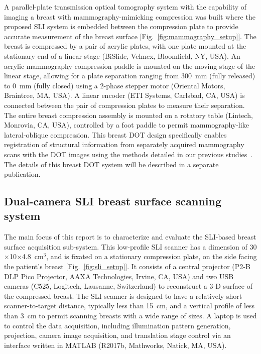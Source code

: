 A parallel-plate transmission optical tomography system with the capability of imaging a breast with mammography-mimicking compression was built where the proposed SLI system is embedded between the compression plate to provide accurate measurement of the breast surface [Fig.~\ref{fig:mammography_setup}]. The breast is compressed by a pair of acrylic plates, with one plate mounted at the stationary end of a linear stage (BiSlide, Velmex, Bloomfield, NY, USA). An acrylic mammography compression paddle is mounted on the moving stage of the linear stage, allowing for a plate separation ranging from 300~mm (fully released) to 0~mm (fully closed) using a 2-phase stepper motor (Oriental Motors, Braintree, MA, USA). A linear encoder (ETI Systems, Carlsbad, CA, USA) is connected between the pair of compression plates to measure their separation. The entire breast compression assembly is mounted on a rotatory table (Lintech, Monrovia, CA, USA), controlled by a foot paddle to permit mammography-like lateral-oblique compression. This breast DOT design specifically enables registration of structural information from separately acquired mammography scans with the DOT images using the methods detailed in our previous studies~\cite{Deng2015}. The details of this breast DOT system will be described in a separate publication.%

\subsection{Dual-camera SLI breast surface scanning system}\label{sec:sli}
The main focus of this report is to characterize and evaluate the SLI-based breast surface acquisition sub-system. This low-profile SLI scanner has a dimension of 30$\times$10$\times$4.8~cm$^3$, and is fixated on a stationary compression plate, on the side facing the patient's breast [Fig.~\ref{fig:sli_setup}]. It consists of a central projector (P2-B DLP Pico Projector, AAXA Technologies, Irvine, CA, USA) and two USB cameras (C525, Logitech, Lausanne, Switzerland) to reconstruct a 3-D surface of the compressed breast. The SLI scanner is designed to have a relatively short scanner-to-target distance, typically less than 15~cm, and a vertical profile of less than 3~cm to permit scanning breasts with a wide range of sizes. A laptop is used to control the data acquisition, including illumination pattern generation, projection, camera image acquisition, and translation stage control via an interface written in MATLAB (R2017b, Mathworks, Natick, MA, USA).

